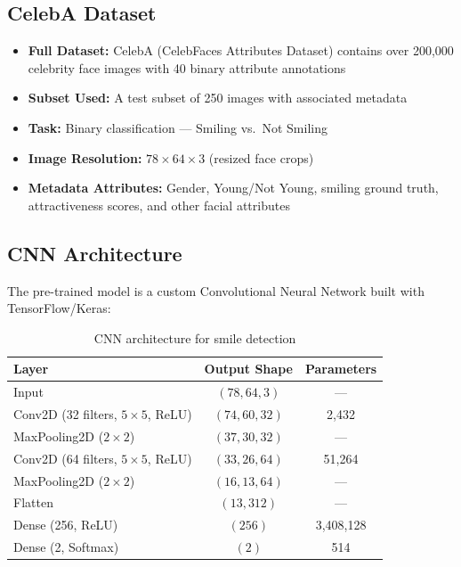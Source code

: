 \documentclass[12pt,a4paper]{article}
\begin{document}
\subsection{CelebA Dataset}
\begin{itemize}
    \item \textbf{Full Dataset:} CelebA (CelebFaces Attributes Dataset) contains over 200,000 celebrity face images with 40 binary attribute annotations
    \item \textbf{Subset Used:} A test subset of 250 images with associated metadata
    \item \textbf{Task:} Binary classification --- Smiling vs.\ Not Smiling
    \item \textbf{Image Resolution:} $78 \times 64 \times 3$ (resized face crops)
    \item \textbf{Metadata Attributes:} Gender, Young/Not Young, smiling ground truth, attractiveness scores, and other facial attributes
\end{itemize}

\subsection{CNN Architecture}
The pre-trained model is a custom Convolutional Neural Network built with TensorFlow/Keras:

\begin{table}[H]
    \centering
    \caption{CNN architecture for smile detection}
    \begin{tabular}{lcc}
        \toprule
        \textbf{Layer} & \textbf{Output Shape} & \textbf{Parameters} \\
        \midrule
        Input & $(78, 64, 3)$ & --- \\
        Conv2D (32 filters, $5 \times 5$, ReLU) & $(74, 60, 32)$ & 2,432 \\
        MaxPooling2D ($2 \times 2$) & $(37, 30, 32)$ & --- \\
        Conv2D (64 filters, $5 \times 5$, ReLU) & $(33, 26, 64)$ & 51,264 \\
        MaxPooling2D ($2 \times 2$) & $(16, 13, 64)$ & --- \\
        Flatten & $(13,312)$ & --- \\
        Dense (256, ReLU) & $(256)$ & 3,408,128 \\
        Dense (2, Softmax) & $(2)$ & 514 \\
        \bottomrule
    \end{tabular}
    \label{tab:cnn_arch}
\end{table}
\end{document}
